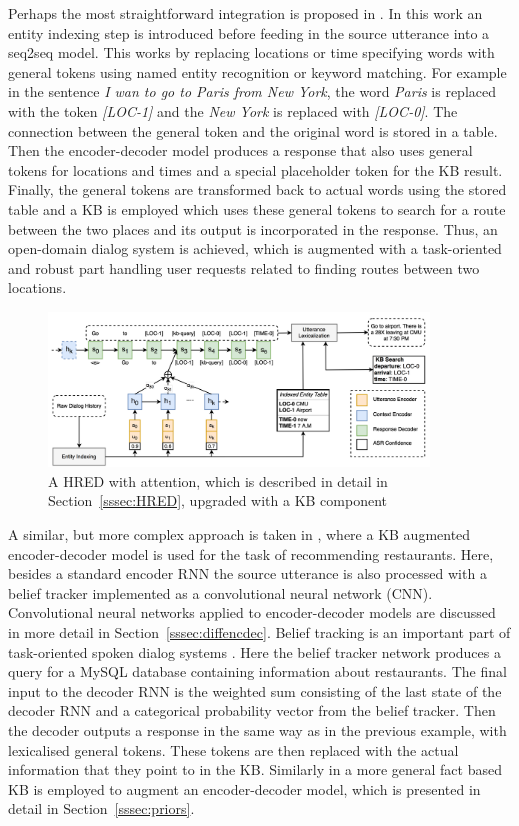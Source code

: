 \documentclass[12pt]{article}
\begin{document}
Perhaps the most straightforward integration is proposed in \cite{Zhao:2017}. In this work an entity indexing step is introduced before feeding in the source utterance into a seq2seq model. This works by replacing locations or time specifying words with general tokens using named entity recognition or keyword matching. For example in the sentence \textit{I wan to go to Paris from New York}, the word \textit{Paris} is replaced with the token \textit{[LOC-1]} and the \textit{New York} is replaced with \textit{[LOC-0]}. The connection between the general token and the original word is stored in a table.  Then the encoder-decoder model produces a response that also uses general tokens for locations and times and a special placeholder token for the KB result. Finally, the general tokens are transformed back to actual words using the stored table and a KB is employed which uses these general tokens to search for a route between the two places and its output is incorporated in the response. Thus, an open-domain dialog system is achieved, which is augmented with a task-oriented and robust part handling user requests related to finding routes between two locations.

\begin{figure}[H]
	\centering
	\includegraphics[width=0.9\textwidth]{pics/KB.png}
	\caption{A HRED with attention, which is described in detail in Section~\ref{sssec:HRED}, upgraded with a KB component \cite{Zhao:2017}}
	\label{fig:KB}
\end{figure}

A similar, but more complex approach is taken in \cite{Wen:2016}, where a KB augmented encoder-decoder model is used for the task of recommending restaurants. Here, besides a standard encoder RNN the source utterance is also processed with a belief tracker implemented as a convolutional neural network (CNN). Convolutional neural networks applied to encoder-decoder models are discussed in more detail in Section~\ref{sssec:diffencdec}. Belief tracking is an important part of task-oriented spoken dialog systems \cite{Henderson:2015}. Here the belief tracker network produces a query for a MySQL database containing information about restaurants. The final input to the decoder RNN is the weighted sum consisting of the last state of the decoder RNN and a categorical probability vector from the belief tracker. Then the decoder outputs a response in the same way as in the previous example, with lexicalised general tokens. These tokens are then replaced with the actual information that they point to in the KB. Similarly in \cite{Ghazvininejad:2017} a more general fact based KB is employed to augment an encoder-decoder model, which is presented in detail in Section~\ref{sssec:priors}.
\end{document}

